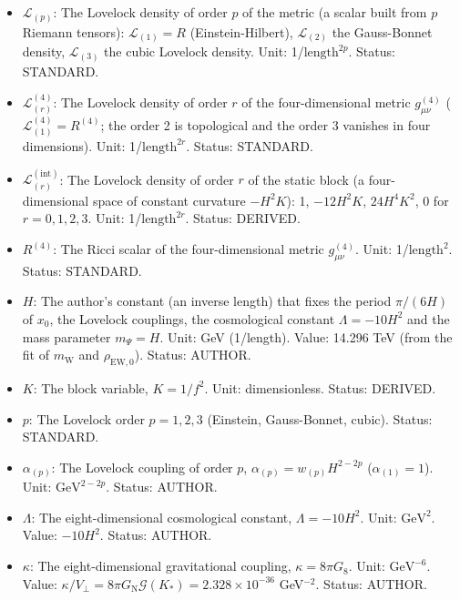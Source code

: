 \documentclass[
  10pt,
]{article}
\providecommand{\tightlist}{%
  \setlength{\itemsep}{0pt}\setlength{\parskip}{0pt}}
\begin{document}
\begin{itemize}
\tightlist
\item
  \(\mathcal{L}_{(p)}\): The Lovelock density of order \(p\) of the
  metric (a scalar built from \(p\) Riemann tensors):
  \(\mathcal{L}_{(1)} = R\) (Einstein-Hilbert), \(\mathcal{L}_{(2)}\)
  the Gauss-Bonnet density, \(\mathcal{L}_{(3)}\) the cubic Lovelock
  density. Unit: 1/\(\mathrm{length}^{2p}\). Status: STANDARD.
\item
  \(\mathcal{L}^{(4)}_{(r)}\): The Lovelock density of order \(r\) of
  the four-dimensional metric \(g^{(4)}_{\mu\nu}\)
  (\(\mathcal{L}^{(4)}_{(1)} = R^{(4)}\); the order 2 is topological and
  the order 3 vanishes in four dimensions). Unit:
  1/\(\mathrm{length}^{2r}\). Status: STANDARD.
\item
  \(\mathcal{L}^{(\mathrm{int})}_{(r)}\): The Lovelock density of order
  \(r\) of the static block (a four-dimensional space of constant
  curvature \(-H^2K\)): 1, \(-12H^2K\), \(24H^4K^2\), 0 for
  \(r = 0, 1, 2, 3\). Unit: 1/\(\mathrm{length}^{2r}\). Status: DERIVED.
\item
  \(R^{(4)}\): The Ricci scalar of the four-dimensional metric
  \(g^{(4)}_{\mu\nu}\). Unit: 1/\(\mathrm{length}^{2}\). Status:
  STANDARD.
\item
  \(H\): The author's constant (an inverse length) that fixes the period
  \(\pi/(6H)\) of \(x_0\), the Lovelock couplings, the cosmological
  constant \(\Lambda = -10H^2\) and the mass parameter \(m_\Psi = H\).
  Unit: GeV (1/length). Value: 14.296 TeV (from the fit of
  \(m_{\mathrm{W}}\) and \(\rho_{\mathrm{EW},0}\)). Status: AUTHOR.
\item
  \(K\): The block variable, \(K = 1/f^2\). Unit: dimensionless. Status:
  DERIVED.
\item
  \(p\): The Lovelock order \(p = 1, 2, 3\) (Einstein, Gauss-Bonnet,
  cubic). Status: STANDARD.
\item
  \(\alpha_{(p)}\): The Lovelock coupling of order \(p\),
  \(\alpha_{(p)} = w_{(p)}H^{2-2p}\) (\(\alpha_{(1)} = 1\)). Unit:
  \(\mathrm{GeV}^{2-2p}\). Status: AUTHOR.
\item
  \(\Lambda\): The eight-dimensional cosmological constant,
  \(\Lambda = -10H^2\). Unit: \(\mathrm{GeV}^{2}\). Value: \(-10H^2\).
  Status: AUTHOR.
\item
  \(\kappa\): The eight-dimensional gravitational coupling,
  \(\kappa = 8\pi G_8\). Unit: \(\mathrm{GeV}^{-6}\). Value:
  \(\kappa/V_\perp = 8\pi G_{\mathrm{N}}\mathcal{G}(K_*) = 2.328\times10^{-36}\)
  GeV\(^{-2}\). Status: AUTHOR.

\end{itemize}
\end{document}
